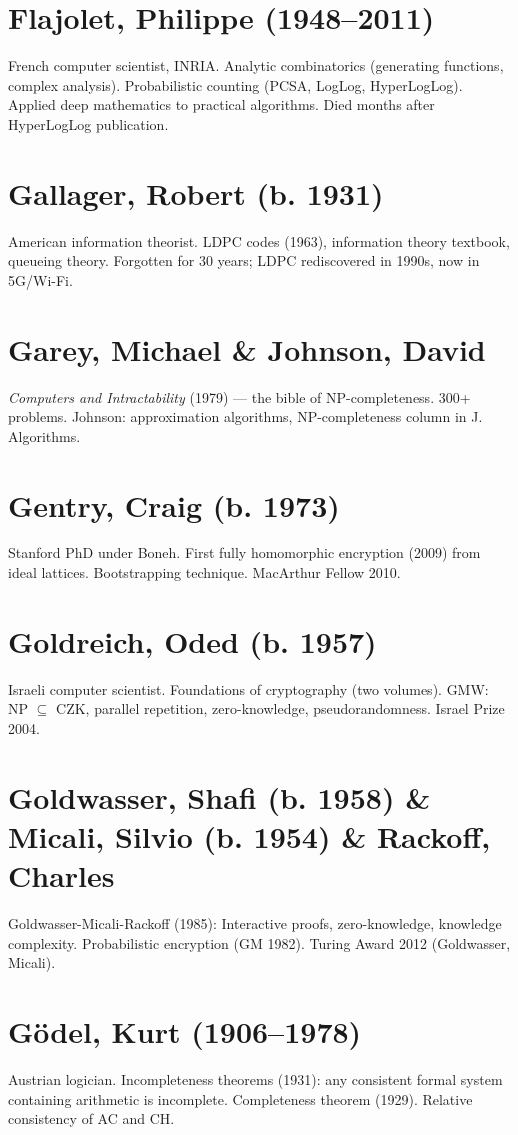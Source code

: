 \section*{Flajolet, Philippe (1948--2011)}
French computer scientist, INRIA. Analytic combinatorics (generating functions, complex analysis). Probabilistic counting (PCSA, LogLog, HyperLogLog). Applied deep mathematics to practical algorithms. Died months after HyperLogLog publication.

\section*{Gallager, Robert (b. 1931)}
American information theorist. LDPC codes (1963), information theory textbook, queueing theory. Forgotten for 30 years; LDPC rediscovered in 1990s, now in 5G/Wi-Fi.

\section*{Garey, Michael \& Johnson, David}
\emph{Computers and Intractability} (1979) — the bible of NP-completeness. 300+ problems. Johnson: approximation algorithms, NP-completeness column in J. Algorithms.

\section*{Gentry, Craig (b. 1973)}
Stanford PhD under Boneh. First fully homomorphic encryption (2009) from ideal lattices. Bootstrapping technique. MacArthur Fellow 2010.

\section*{Goldreich, Oded (b. 1957)}
Israeli computer scientist. Foundations of cryptography (two volumes). GMW: NP $\subseteq$ CZK, parallel repetition, zero-knowledge, pseudorandomness. Israel Prize 2004.

\section*{Goldwasser, Shafi (b. 1958) \& Micali, Silvio (b. 1954) \& Rackoff, Charles}
Goldwasser-Micali-Rackoff (1985): Interactive proofs, zero-knowledge, knowledge complexity. Probabilistic encryption (GM 1982). Turing Award 2012 (Goldwasser, Micali).

\section*{Gödel, Kurt (1906--1978)}
Austrian logician. Incompleteness theorems (1931): any consistent formal system containing arithmetic is incomplete. Completeness theorem (1929). Relative consistency of AC and CH.

